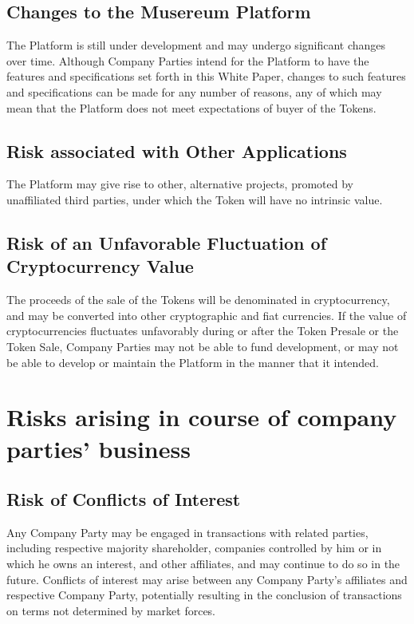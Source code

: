 \documentclass[12pt]{report}
\begin{document}
\subsection*{Changes to the Musereum Platform}
The Platform is still under development and may undergo significant changes over time. Although Company Parties intend for the Platform to have the features and specifications set forth in this White Paper, changes to such features and specifications can be made for any number of reasons, any of which may mean that the Platform does not meet expectations of buyer of the Tokens.

\subsection*{Risk associated with Other Applications}
The Platform may give rise to other, alternative projects, promoted by unaffiliated third parties, under which the Token will have no intrinsic value.

\subsection*{Risk of an Unfavorable Fluctuation of Cryptocurrency Value}
The proceeds of the sale of the Tokens will be denominated in cryptocurrency, and may be converted into other cryptographic and fiat currencies. If the value of cryptocurrencies fluctuates unfavorably during or after the Token Presale or the Token Sale, Company Parties may not be able to fund development, or may not be able to develop or maintain the Platform in the manner that it intended.

\section{Risks arising in course of company parties' business}
\subsection*{Risk of Conflicts of Interest}
Any Company Party may be engaged in transactions with related parties, including respective majority shareholder, companies controlled by him or in which he owns an interest, and other affiliates, and may continue to do so in the future. Conflicts of interest may arise between any Company Party’s affiliates and respective Company Party, potentially resulting in the conclusion of transactions on terms not determined by market forces.
\end{document}
